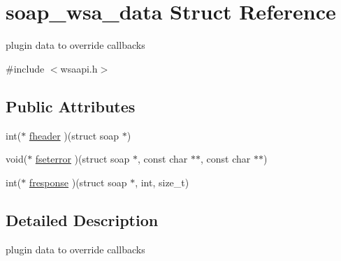 \hypertarget{structsoap__wsa__data}{
\section{soap\_\-wsa\_\-data Struct Reference}
\label{structsoap__wsa__data}
}


plugin data to override callbacks  




{\ttfamily \#include $<$wsaapi.h$>$}

\subsection*{Public Attributes}
\begin{DoxyCompactItemize}
\item 
int($\ast$ \hyperlink{structsoap__wsa__data_a22ab7db8c4963c3a65c7770791c84297}{fheader} )(struct soap $\ast$)
\item 
void($\ast$ \hyperlink{structsoap__wsa__data_a6e6dc7ea6bc3b4c4cf170b59b4fb7720}{fseterror} )(struct soap $\ast$, const char $\ast$$\ast$, const char $\ast$$\ast$)
\item 
int($\ast$ \hyperlink{structsoap__wsa__data_ae6add454e2675015b08fccd0720978ff}{fresponse} )(struct soap $\ast$, int, size\_\-t)
\end{DoxyCompactItemize}


\subsection{Detailed Description}
plugin data to override callbacks 

